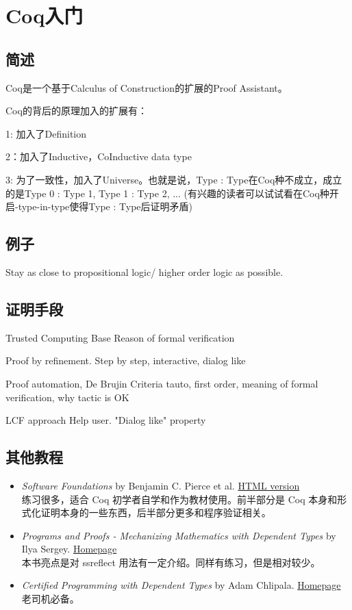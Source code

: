\section{Coq入门}

\subsection{简述}
Coq是一个基于Calculus of Construction的扩展的Proof Assistant。

Coq的背后的原理加入的扩展有：

1: 加入了Definition

2：加入了Inductive，CoInductive data type

3: 为了一致性，加入了Universe。也就是说，Type : Type在Coq种不成立，成立的是Type 0 : Type 1, Type 1 : Type 2, ... (有兴趣的读者可以试试看在Coq种开启-type-in-type使得Type : Type后证明矛盾)

\subsection{例子}
Stay as close to propositional logic/ higher order logic as possible.

\subsection{证明手段}
Trusted Computing Base
Reason of formal verification

Proof by refinement.
Step by step, interactive, dialog like

Proof automation, De Brujin Criteria
tauto, first order, meaning of formal verification, why tactic is OK

LCF approach
Help user. "Dialog like" property

\subsection{其他教程}

\begin{itemize}
    \item \emph{Software Foundations} by Benjamin C. Pierce et al.
          \href{https://www.cis.upenn.edu/~bcpierce/sf/current/index.html}{HTML version}\\
          练习很多，适合 Coq 初学者自学和作为教材使用。前半部分是 Coq 本身和形式化证明本身的一些东西，后半部分更多和程序验证相关。
    \item \emph{Programs and Proofs - Mechanizing Mathematics with Dependent Types} by Ilya Sergey.
          \href{http://ilyasergey.net/pnp}{Homepage}\\
          本书亮点是对 ssreflect 用法有一定介绍。同样有练习，但是相对较少。
    \item \emph{Certified Programming with Dependent Types} by Adam Chlipala.
          \href{http://adam.chlipala.net/cpdt/}{Homepage}\\
          老司机必备。 %
\end{itemize}
